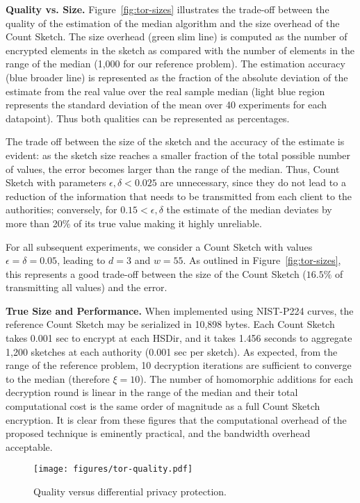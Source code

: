 \documentclass[conference]{IEEEtran}
\newcommand{\descr}[1]{\medskip \noindent \textbf{#1}}
\begin{document}
\descr{Quality vs. Size.} Figure~\ref{fig:tor-sizes} illustrates the trade-off between the quality of the estimation of the median algorithm and the size overhead of the Count Sketch. The size overhead (green slim line) is computed as the number of encrypted elements in the sketch as compared with the number of elements in the range of the median (1,000 for our reference problem). The estimation accuracy (blue broader line) is represented as the fraction of the absolute deviation of the estimate from the real value over the real sample median (light blue region represents the standard deviation of the mean over 40 experiments for each datapoint). Thus both qualities can be represented as percentages. 

The trade off between the size of the sketch and the accuracy of the estimate is evident: as the sketch size reaches a smaller fraction of the total possible number of values, the error becomes larger than the range of the median. Thus, Count Sketch with parameters $ \epsilon, \delta < 0.025  $ are unnecessary, since they do not lead to a reduction of the information that needs to be transmitted from each client to the authorities; conversely, for $ 0.15 < \epsilon, \delta $ the estimate of the median deviates by more than 20\% of its true value making it highly unreliable.

For all subsequent experiments, we consider a Count Sketch with values $\epsilon = \delta = 0.05$, leading to $d = 3$ and $w = 55$. As outlined in Figure~\ref{fig:tor-sizes}, this represents a good trade-off between the size of the Count Sketch ($16.5\%$ of transmitting all values) and the error. 

\descr{True Size and Performance.} When implemented using NIST-P224 curves, the reference Count Sketch may be serialized in 10,898 bytes. Each Count Sketch takes 0.001 sec to encrypt at each HSDir, and it takes 1.456 seconds to aggregate 1,200 sketches at each authority (0.001 sec per sketch). As expected, from the range of the reference problem, 10 decryption iterations are sufficient to converge to the median (therefore $\xi = 10$). The number of homomorphic additions for each decryption round is linear in the range of the median and their total computational cost is the same order of magnitude as a full Count Sketch encryption. It is clear from these figures that the computational overhead of the proposed technique is eminently practical, and the bandwidth overhead acceptable.

\begin{figure}[t]
\centering
\texttt{[image: figures/tor-quality.pdf]}
\vspace{-0.2cm}
\caption{\label{fig:tor-quality} Quality versus differential privacy protection.}
\vspace{-0.2cm}
\end{figure}
\end{document}
